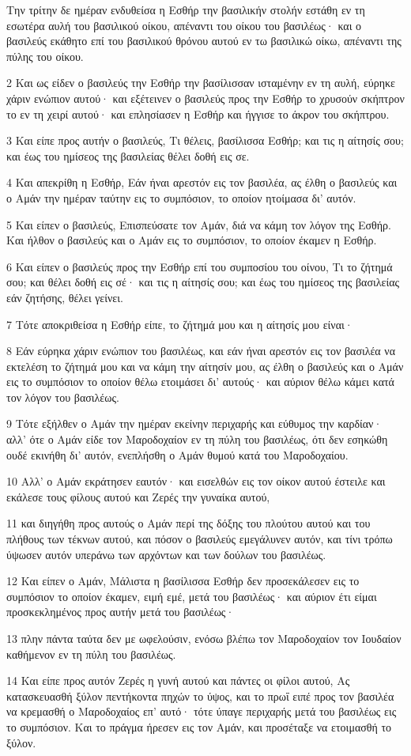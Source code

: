 \par Την τρίτην δε ημέραν ενδυθείσα η Εσθήρ την βασιλικήν στολήν εστάθη εν τη εσωτέρα αυλή του βασιλικού οίκου, απέναντι του οίκου του βασιλέως· και ο βασιλεύς εκάθητο επί του βασιλικού θρόνου αυτού εν τω βασιλικώ οίκω, απέναντι της πύλης του οίκου.
\par 2 Και ως είδεν ο βασιλεύς την Εσθήρ την βασίλισσαν ισταμένην εν τη αυλή, εύρηκε χάριν ενώπιον αυτού· και εξέτεινεν ο βασιλεύς προς την Εσθήρ το χρυσούν σκήπτρον το εν τη χειρί αυτού· και επλησίασεν η Εσθήρ και ήγγισε το άκρον του σκήπτρου.
\par 3 Και είπε προς αυτήν ο βασιλεύς, Τι θέλεις, βασίλισσα Εσθήρ; και τις η αίτησίς σου; και έως του ημίσεος της βασιλείας θέλει δοθή εις σε.
\par 4 Και απεκρίθη η Εσθήρ, Εάν ήναι αρεστόν εις τον βασιλέα, ας έλθη ο βασιλεύς και ο Αμάν την ημέραν ταύτην εις το συμπόσιον, το οποίον ητοίμασα δι' αυτόν.
\par 5 Και είπεν ο βασιλεύς, Επισπεύσατε τον Αμάν, διά να κάμη τον λόγον της Εσθήρ. Και ήλθον ο βασιλεύς και ο Αμάν εις το συμπόσιον, το οποίον έκαμεν η Εσθήρ.
\par 6 Και είπεν ο βασιλεύς προς την Εσθήρ επί του συμποσίου του οίνου, Τι το ζήτημά σου; και θέλει δοθή εις σέ· και τις η αίτησίς σου; και έως του ημίσεος της βασιλείας εάν ζητήσης, θέλει γείνει.
\par 7 Τότε αποκριθείσα η Εσθήρ είπε, το ζήτημά μου και η αίτησίς μου είναι·
\par 8 Εάν εύρηκα χάριν ενώπιον του βασιλέως, και εάν ήναι αρεστόν εις τον βασιλέα να εκτελέση το ζήτημά μου και να κάμη την αίτησίν μου, ας έλθη ο βασιλεύς και ο Αμάν εις το συμπόσιον το οποίον θέλω ετοιμάσει δι' αυτούς· και αύριον θέλω κάμει κατά τον λόγον του βασιλέως.
\par 9 Τότε εξήλθεν ο Αμάν την ημέραν εκείνην περιχαρής και εύθυμος την καρδίαν· αλλ' ότε ο Αμάν είδε τον Μαροδοχαίον εν τη πύλη του βασιλέως, ότι δεν εσηκώθη ουδέ εκινήθη δι' αυτόν, ενεπλήσθη ο Αμάν θυμού κατά του Μαροδοχαίου.
\par 10 Αλλ' ο Αμάν εκράτησεν εαυτόν· και εισελθών εις τον οίκον αυτού έστειλε και εκάλεσε τους φίλους αυτού και Ζερές την γυναίκα αυτού,
\par 11 και διηγήθη προς αυτούς ο Αμάν περί της δόξης του πλούτου αυτού και του πλήθους των τέκνων αυτού, και πόσον ο βασιλεύς εμεγάλυνεν αυτόν, και τίνι τρόπω ύψωσεν αυτόν υπεράνω των αρχόντων και των δούλων του βασιλέως.
\par 12 Και είπεν ο Αμάν, Μάλιστα η βασίλισσα Εσθήρ δεν προσεκάλεσεν εις το συμπόσιον το οποίον έκαμεν, ειμή εμέ, μετά του βασιλέως· και αύριον έτι είμαι προσκεκλημένος προς αυτήν μετά του βασιλέως·
\par 13 πλην πάντα ταύτα δεν με ωφελούσιν, ενόσω βλέπω τον Μαροδοχαίον τον Ιουδαίον καθήμενον εν τη πύλη του βασιλέως.
\par 14 Και είπε προς αυτόν Ζερές η γυνή αυτού και πάντες οι φίλοι αυτού, Ας κατασκευασθή ξύλον πεντήκοντα πηχών το ύψος, και το πρωΐ ειπέ προς τον βασιλέα να κρεμασθή ο Μαροδοχαίος επ' αυτό· τότε ύπαγε περιχαρής μετά του βασιλέως εις το συμπόσιον. Και το πράγμα ήρεσεν εις τον Αμάν, και προσέταξε να ετοιμασθή το ξύλον.

